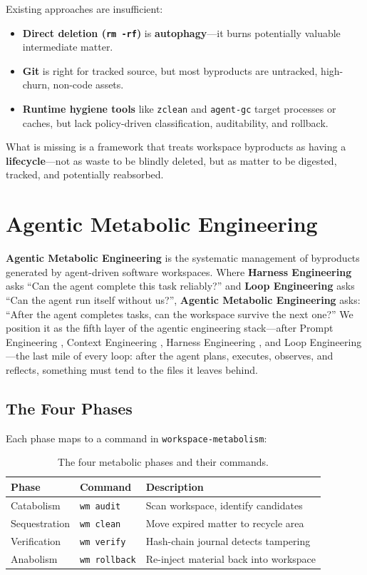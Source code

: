 \documentclass[sigconf,anonymous]{acmart}
\begin{document}
Existing approaches are insufficient:
\begin{itemize}
\item \textbf{Direct deletion (\texttt{rm -rf})} is \textbf{autophagy}---it burns potentially valuable intermediate matter.
\item \textbf{Git} is right for tracked source, but most byproducts are untracked, high-churn, non-code assets.
\item \textbf{Runtime hygiene tools} like \texttt{zclean} \cite{zclean2026} and \texttt{agent-gc} \cite{jeong2026agentgc} target processes or caches, but lack policy-driven classification, auditability, and rollback.
\end{itemize}

What is missing is a framework that treats workspace byproducts as having a \textbf{lifecycle}---not as waste to be blindly deleted, but as matter to be digested, tracked, and potentially reabsorbed.

\section{Agentic Metabolic Engineering}
\textbf{Agentic Metabolic Engineering} is the systematic management of byproducts generated by agent-driven software workspaces. Where \textbf{Harness Engineering} \cite{harness2026} asks ``Can the agent complete this task reliably?'' and \textbf{Loop Engineering} \cite{loops2026} asks ``Can the agent run itself without us?'', \textbf{Agentic Metabolic Engineering} asks: ``After the agent completes tasks, can the workspace survive the next one?'' We position it as the fifth layer of the agentic engineering stack---after Prompt Engineering \cite{schulhoff2024}, Context Engineering \cite{context2025}, Harness Engineering \cite{harness2026}, and Loop Engineering \cite{loops2026}---the last mile of every loop: after the agent plans, executes, observes, and reflects, something must tend to the files it leaves behind.

\subsection{The Four Phases}
Each phase maps to a command in \texttt{workspace-metabolism}:
\begin{table}[h]
\caption{The four metabolic phases and their commands.}
\label{tab:phases}
\begin{tabular}{lll}
\textbf{Phase} & \textbf{Command} & \textbf{Description}\\
\hline
Catabolism & \texttt{wm audit} & Scan workspace, identify candidates\\
Sequestration & \texttt{wm clean} & Move expired matter to recycle area\\
Verification & \texttt{wm verify} & Hash-chain journal detects tampering\\
Anabolism & \texttt{wm rollback} & Re-inject material back into workspace\\
\end{tabular}
\end{table}
\end{document}
